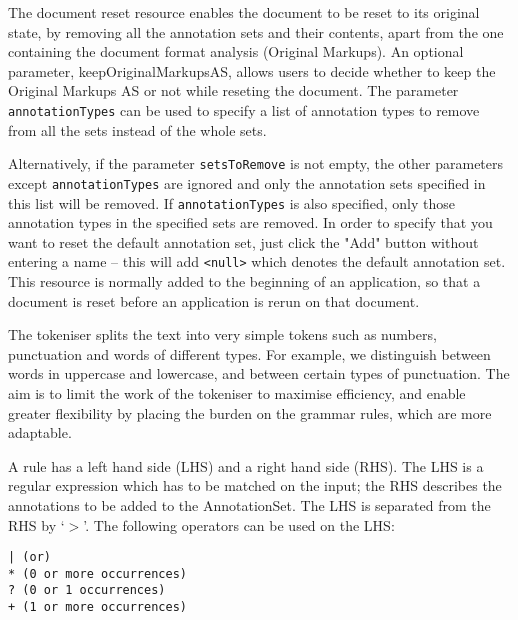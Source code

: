 The document reset resource enables the document to be reset to its
original state, by removing all the annotation sets and their
contents, apart from the one containing the document format analysis
(Original Markups). An optional parameter, keepOriginalMarkupsAS, allows users
to decide whether to keep the Original Markups AS or not while reseting the
document. The parameter \texttt{annotationTypes} can be used to specify
a list of annotation types to remove from all the sets instead of the
whole sets. 

Alternatively, if the parameter \texttt{setsToRemove} is not empty, 
the other parameters except \texttt{annotationTypes}  are ignored 
and only the annotation sets 
specified in this list will be removed. If \texttt{annotationTypes} is also
specified, only those annotation types in the specified sets are removed. 
In order to specify that you want to reset the default
annotation set, just click the "Add" button without entering a name --
this will add \verb|<null>| which denotes the default annotation set.
This resource is normally added to the beginning of an application, so
that a document is reset before an application is rerun on that document.




The tokeniser splits the text into very simple tokens such as numbers,
punctuation and words of different types. For example, we distinguish
between words in uppercase and lowercase, and between certain types of
punctuation. The aim is to limit the work of the tokeniser to maximise efficiency, and
enable greater flexibility by placing the burden on the grammar rules,
which are more adaptable.

A rule has a left hand side (LHS) and a right hand side (RHS).
The LHS is a regular expression which has to be matched on the input;
the RHS describes the annotations to be added to the AnnotationSet.
The LHS is separated from the RHS by `$>$'.
The following operators can be used on the LHS:
\begin{small}
\begin{verbatim}
| (or)
* (0 or more occurrences)
? (0 or 1 occurrences)
+ (1 or more occurrences)
\end{verbatim}
\end{small}

